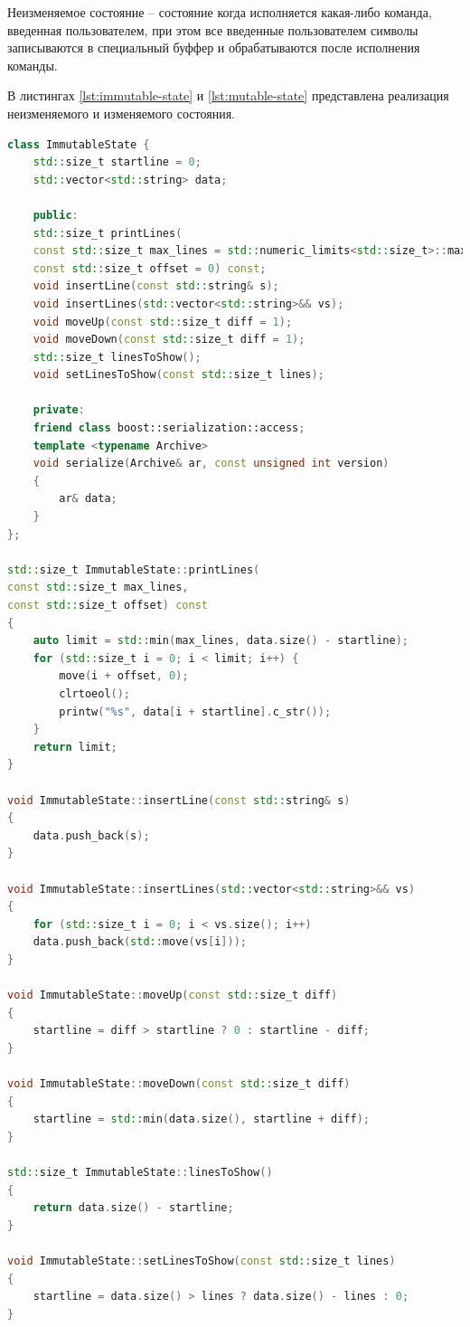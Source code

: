 Неизменяемое состояние -- состояние когда исполняется какая-либо команда, введенная пользователем, при этом все введенные пользователем символы записываются в специальный буффер и обрабатываются после исполнения команды.

В листингах \ref{lst:immutable-state} и \ref{lst:mutable-state} представлена реализация неизменяемого и изменяемого состояния.\\

\begin{lstlisting}[label=lst:immutable-state,caption=Класс\, описывающий неизменяемое состояние системы,language=c++]
class ImmutableState {
	std::size_t startline = 0;
	std::vector<std::string> data;
	
	public:
	std::size_t printLines(
	const std::size_t max_lines = std::numeric_limits<std::size_t>::max(),
	const std::size_t offset = 0) const;
	void insertLine(const std::string& s);
	void insertLines(std::vector<std::string>&& vs);
	void moveUp(const std::size_t diff = 1);
	void moveDown(const std::size_t diff = 1);
	std::size_t linesToShow();
	void setLinesToShow(const std::size_t lines);
	
	private:
	friend class boost::serialization::access;
	template <typename Archive>
	void serialize(Archive& ar, const unsigned int version)
	{
		ar& data;
	}
};

std::size_t ImmutableState::printLines(
const std::size_t max_lines,
const std::size_t offset) const
{
	auto limit = std::min(max_lines, data.size() - startline);
	for (std::size_t i = 0; i < limit; i++) {
		move(i + offset, 0);
		clrtoeol();
		printw("%s", data[i + startline].c_str());
	}
	return limit;
}

void ImmutableState::insertLine(const std::string& s)
{
	data.push_back(s);
}

void ImmutableState::insertLines(std::vector<std::string>&& vs)
{
	for (std::size_t i = 0; i < vs.size(); i++)
	data.push_back(std::move(vs[i]));
}

void ImmutableState::moveUp(const std::size_t diff)
{
	startline = diff > startline ? 0 : startline - diff;
}

void ImmutableState::moveDown(const std::size_t diff)
{
	startline = std::min(data.size(), startline + diff);
}

std::size_t ImmutableState::linesToShow()
{
	return data.size() - startline;
}

void ImmutableState::setLinesToShow(const std::size_t lines)
{
	startline = data.size() > lines ? data.size() - lines : 0;
}
\end{lstlisting}

